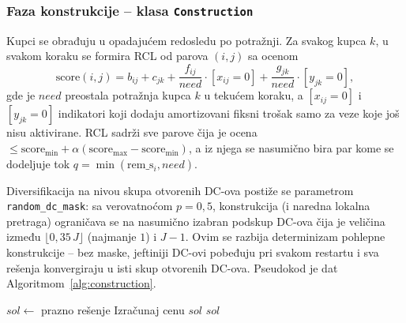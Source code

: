 \documentclass[12pt,a4paper]{article}
\begin{document}
\subsubsection{Faza konstrukcije -- klasa \texttt{Construction}}

Kupci se obrađuju u opadajućem redosledu po potražnji. Za svakog kupca $k$, u
svakom koraku se formira RCL od parova $(i,j)$ sa ocenom
\begin{equation} \label{eq:score_cons}
\text{score}(i,j) = b_{ij} + c_{jk}
  + \frac{f_{ij}}{need}\cdot[x_{ij} = 0]
  + \frac{g_{jk}}{need}\cdot[y_{jk} = 0],
\end{equation}
gde je $need$ preostala potražnja kupca $k$ u tekućem koraku, a
$[x_{ij} = 0]$ i $[y_{jk} = 0]$ indikatori koji dodaju amortizovani fiksni
trošak samo za veze koje još nisu aktivirane. RCL sadrži sve parove čija je
ocena $\leq \text{score}_{\min} + \alpha(\text{score}_{\max} -
\text{score}_{\min})$, a iz njega se nasumično bira par kome se dodeljuje tok
$q = \min(\text{rem\_s}_i, need)$.

Diversifikacija na nivou skupa otvorenih DC-ova postiže se parametrom
\texttt{random\_dc\_mask}: sa verovatnoćom $p = 0{,}5$, konstrukcija (i naredna
lokalna pretraga) ograničava se na nasumično izabran podskup DC-ova čija je
veličina između $\lfloor 0{,}35\,J \rfloor$ (najmanje $1$) i $J-1$. Ovim se
razbija determinizam pohlepne
konstrukcije -- bez maske, jeftiniji DC-ovi pobeđuju pri svakom restartu i
sva rešenja konvergiraju u isti skup otvorenih DC-ova. Pseudokod je dat
Algoritmom~\ref{alg:construction}.

\begin{algorithm}[H]
\caption{GreedyRandomizedConstruction$(D, \alpha, \text{allowed\_dc})$}
\label{alg:construction}
\SetAlgoLined
$sol \leftarrow$ prazno rešenje\;
Izračunaj cenu $sol$\;
\Return $sol$
\end{algorithm}
\end{document}
